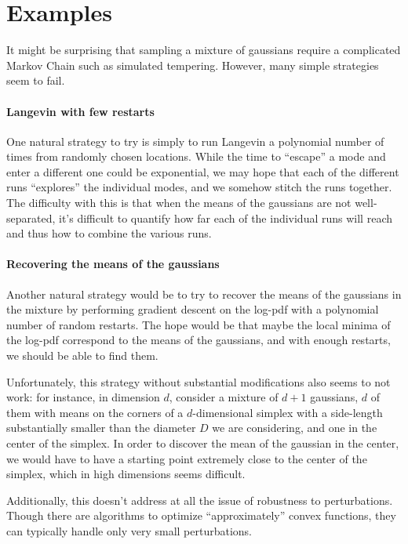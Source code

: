 \section{Examples}
\label{sec:examples}
It might be surprising that sampling a mixture of gaussians require a complicated Markov Chain such as simulated tempering. However, many simple strategies seem to fail. 

\paragraph{Langevin with few restarts} One natural strategy to try is simply to run Langevin a polynomial number of times from randomly chosen locations. While the time to ``escape'' a mode and enter a different one could be exponential, we may hope that each of the different runs ``explores'' the individual modes, and we somehow stitch the runs together. The difficulty with this is that when the means of the gaussians are not well-separated, it's difficult to quantify how far each of the individual runs will reach and thus how to combine the various runs.  

\paragraph{Recovering the means of the gaussians} Another natural strategy would be to try to recover the means of the gaussians in the mixture by performing gradient descent on the log-pdf with a polynomial number of random restarts. The hope would be that maybe the local minima of the log-pdf correspond to the means of the gaussians, and with enough restarts, we should be able to find them. 

Unfortunately, this strategy without substantial modifications also seems to not work: for instance, in dimension $d$, consider a mixture of $d+1$ gaussians, $d$ of them with means on the corners of a $d$-dimensional simplex with a side-length substantially smaller than the diameter $D$ we are considering, and one in the center of the simplex. In order to discover the mean of the gaussian in the center, we would have to have a starting point extremely close to the center of the simplex, which in high dimensions seems difficult.

Additionally, this doesn't address at all the issue of robustness to perturbations. Though there are algorithms to optimize ``approximately'' convex functions, they can typically handle only very small perturbations. \cite{belloni2015escaping, risteski2016algorithms}
   
